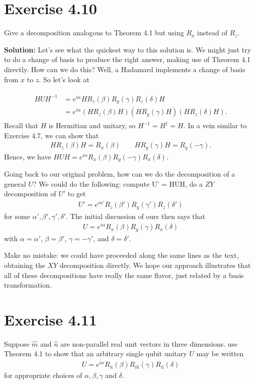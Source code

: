 \documentclass{book}
\begin{document}
\section*{Exercise 4.10}
    Give a decomposition analogous to Theorem 4.1 but using $R_x$ instead of $R_z$.

    \textbf{Solution:} Let's see what the quickest way to this solution is. We might just try to do a change of basis to produce the right answer, making use of Theorem 4.1 directly. How can we do this? Well, a Hadamard implements a change of basis from $x$ to $z$. So let's look at

    \begin{align}
    \begin{aligned}
        H U H^{-1} &= e^{i\alpha} H R_z(\beta) R_y(\gamma) R_z(\delta) H \\
        &=e^{i\alpha} \left(H R_z(\beta)H\right) \left(H R_y(\gamma) H\right) \left( H R_z(\delta) H\right).
    \end{aligned}
    \end{align}
    Recall that $H$ is Hermitian and unitary, so $H^{-1} = H^\dagger = H$. In a vein similar to Exercise 4.7, we can show that
    \begin{align}
        H R_z(\beta) H = R_x(\beta) \qquad H R_y(\gamma) H = R_y(-\gamma). 
    \end{align}
    Hence, we have $HUH = e^{i\alpha} R_x(\beta) R_y(-\gamma) R_x(\delta)$.

    Going back to our original problem, how can we do the decomposition of a general $U$? We could do the following: compute U' = HUH, do a $ZY$ decomposition of $U'$ to get
    \begin{align}
        U' = e^{i\alpha'}  R_z(\beta') R_y(\gamma') R_z(\delta') 
    \end{align}
    for some $\alpha', \beta', \gamma', \delta'$. The initial discussion of ours then says that 
    \begin{align}
        U = e^{i\alpha} R_x(\beta) R_y(\gamma) R_x(\delta)
    \end{align}
    with $\alpha = \alpha'$, $\beta = \beta'$, $\gamma = -\gamma'$, and $\delta = \delta'$.

    Make no mistake: we could have proceeded along the same lines as the text, obtaining the $XY$ decomposition directly. We hope our approach illustrates that all of these decompositions have really the same flavor, just related by a basis transformation.

\section*{Exercise 4.11}
    Suppose $\hat{m}$ and $\hat{n}$ are non-parallel real unit vectors in three dimensions. use Theorem 4.1 to show that an arbitrary single qubit unitary $U$ may be written
    \begin{align}
        U = e^{i\alpha} R_{\hat{n}}(\beta) R_{\hat{m}}(\gamma) R_{\hat{n}}(\delta)
    \end{align}
    for appropriate choices of $\alpha, \beta, \gamma$ and $\delta$.
\end{document}
